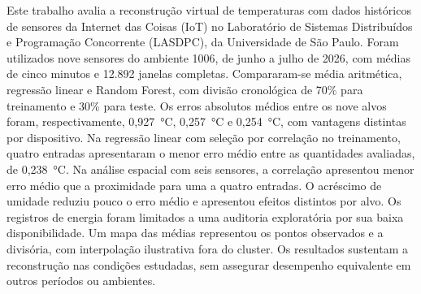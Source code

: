 \documentclass{packages/monografias}
\begin{document}
\imprimircapa
\imprimirfolhaderosto
\pretextual
\begin{resumo}
Este trabalho avalia a reconstrução virtual de temperaturas com dados
históricos de sensores da Internet das Coisas (IoT) no Laboratório de
Sistemas Distribuídos e Programação Concorrente (LASDPC), da Universidade
de São Paulo. Foram utilizados nove sensores do ambiente 1006, de junho
a julho de 2026, com médias de cinco minutos e 12.892 janelas completas.
Compararam-se média aritmética, regressão linear e Random Forest,
com divisão cronológica de 70\% para treinamento e 30\% para teste.
Os erros absolutos médios entre os nove alvos foram, respectivamente,
0,927~°C, 0,257~°C e 0,254~°C, com vantagens distintas por dispositivo.
Na regressão linear com seleção por correlação no treinamento, quatro
entradas apresentaram o menor erro médio entre as quantidades avaliadas,
de 0,238~°C. Na análise espacial com seis sensores, a correlação
apresentou menor erro médio que a proximidade para uma a quatro entradas.
O acréscimo de umidade reduziu pouco o erro médio e apresentou
efeitos distintos por alvo. Os registros de energia foram limitados
a uma auditoria exploratória por sua baixa disponibilidade.
Um mapa das médias representou os pontos observados e a divisória,
com interpolação ilustrativa fora do cluster. Os resultados sustentam
a reconstrução nas condições estudadas, sem assegurar desempenho
equivalente em outros períodos ou ambientes.
\end{resumo}

\tableofcontents
\clearpage

\textual





\postextual
{}
{}

\end{document}
